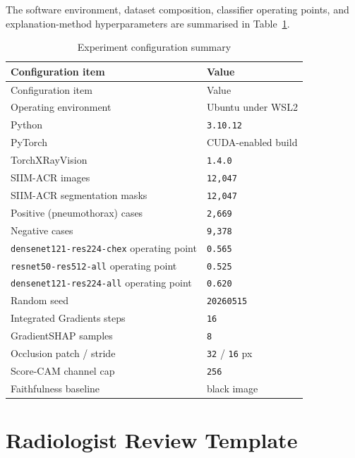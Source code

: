 The software environment, dataset composition, classifier operating
points, and explanation-method hyperparameters are summarised in
Table~\ref{table:a-1}.

\begin{longtable}[]{@{}ll@{}}
	\caption{Experiment configuration summary}\label{table:a-1}\tabularnewline
	\toprule
	\begin{minipage}[b]{0.47\columnwidth}\raggedright
		Configuration item\strut
	\end{minipage} & \begin{minipage}[b]{0.47\columnwidth}\raggedright
		Value\strut
	\end{minipage}\tabularnewline
	\midrule
	\endfirsthead
	\toprule
	\begin{minipage}[b]{0.47\columnwidth}\raggedright
		Configuration item\strut
	\end{minipage} & \begin{minipage}[b]{0.47\columnwidth}\raggedright
		Value\strut
	\end{minipage}\tabularnewline
	\midrule
	\endhead
	Operating environment & Ubuntu under WSL2\tabularnewline
	Python & \texttt{3.10.12}\tabularnewline
	PyTorch & CUDA-enabled build\tabularnewline
	TorchXRayVision & \texttt{1.4.0}\tabularnewline
	\midrule
	SIIM-ACR images & \texttt{12{,}047}\tabularnewline
	SIIM-ACR segmentation masks & \texttt{12{,}047}\tabularnewline
	Positive (pneumothorax) cases & \texttt{2{,}669}\tabularnewline
	Negative cases & \texttt{9{,}378}\tabularnewline
	\midrule
	\texttt{densenet121-\allowbreak res224-\allowbreak chex} operating point & \texttt{0.565}\tabularnewline
	\texttt{resnet50-\allowbreak res512-\allowbreak all} operating point & \texttt{0.525}\tabularnewline
	\texttt{densenet121-\allowbreak res224-\allowbreak all} operating point & \texttt{0.620}\tabularnewline
	\midrule
	Random seed & \texttt{20260515}\tabularnewline
	Integrated Gradients steps & \texttt{16}\tabularnewline
	GradientSHAP samples & \texttt{8}\tabularnewline
	Occlusion patch / stride & \texttt{32} / \texttt{16} px\tabularnewline
	Score-CAM channel cap & \texttt{256}\tabularnewline
	Faithfulness baseline & black image\tabularnewline
	\bottomrule
\end{longtable}

\hypertarget{radiologist-review-template}{%
	\chapter{Radiologist Review
		Template}\label{radiologist-review-template}}


